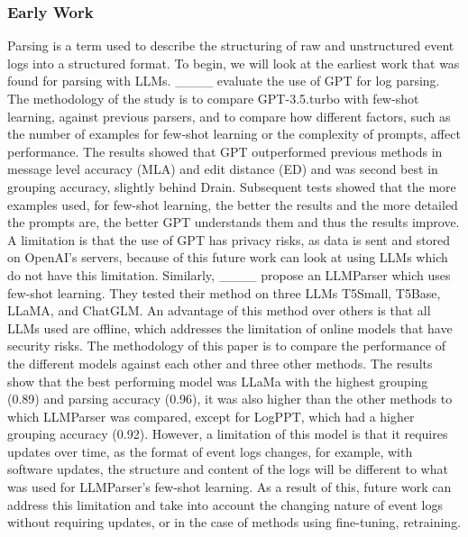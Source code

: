\subsubsection{Early Work}
Parsing is a term used to describe the structuring of raw and unstructured event logs into a structured format. To begin, we will look at the earliest work that was found for parsing with LLMs. ____ evaluate the use of GPT for log parsing. The methodology of the study is to compare GPT-3.5.turbo with few-shot learning, against previous parsers, and to compare how different factors, such as the number of examples for few-shot learning or the complexity of prompts, affect performance. The results showed that GPT outperformed previous methods in message level accuracy (MLA) and edit distance (ED) and was second best in grouping accuracy, slightly behind Drain. Subsequent tests showed that the more examples used, for few-shot learning, the better the results and the more detailed the prompts are, the better GPT understands them and thus the results improve. A limitation is that the use of GPT has privacy risks, as data is sent and stored on OpenAI's servers, because of this future work can look at using LLMs which do not have this limitation. Similarly, ____ propose an LLMParser which uses few-shot learning. They tested their method on three LLMs T5Small, T5Base, LLaMA, and ChatGLM. An advantage of this method over others is that all LLMs used are offline, which addresses the limitation of online models that have security risks. The methodology of this paper is to compare the performance of the different models against each other and three other methods. The results show that the best performing model was LLaMa with the highest grouping (0.89) and parsing accuracy (0.96), it was also higher than the other methods to which LLMParser was compared, except for LogPPT, which had a higher grouping accuracy (0.92). However, a limitation of this model is that it requires updates over time, as the format of event logs changes, for example, with software updates, the structure and content of the logs will be different to what was used for LLMParser's few-shot learning. As a result of this, future work can address this limitation and take into account the changing nature of event logs without requiring updates, or in the case of methods using fine-tuning, retraining. 

